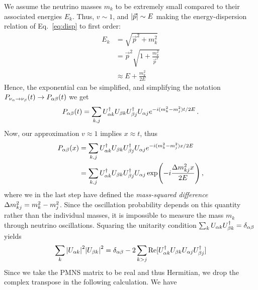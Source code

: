 We assume the neutrino masses $m_k$ to be extremely small compared to their associated energies $E_k$. 
Thus, $v\sim 1$, and $\abs{\vec{p}} \sim E$ making the energy-dispersion relation of Eq.~\ref{eq:disp} to first order:
\begin{align}\label{eq:ultra_rel}
    E_k &= \sqrt{\vec{p}^2 + m_k^2} \nonumber \\
        &= \vec{p}^2\sqrt{1 + \frac{m_k^2}{\vec{p}^2}} \nonumber \\
        &\approx E + \frac{m_k^2}{2E}
\end{align}
Hence, the exponential can be simplified, and simplifying the notation $P_{\nu_\alpha \to \nu_\beta}(t) \to P_{\alpha\beta}(t)$ we get 
\begin{align}
    P_{\alpha\beta}(t) = \sum_{k,j} U^\dagger_{\alpha k}U_{\beta k}U^\dagger_{\beta j}U_{\alpha j} e^{-i(m_k^2-m_j^2)t/2E}\,.
\end{align}
Now, our approximation $v\approx 1$ implies $x\approx t $, thus
\begin{align}
    P_{\ab}(x) &= \sum_{k,j} U^\dagger_{\a k}U_{\b k}U^\dagger_{\b j}U_{\a j} e^{-i(m_k^2-m_j^2)x/2E} \nonumber \\
                       &= \sum_{k,j} U^\dagger_{\a k}U_{\b k}U^\dagger_{\b j}U_{\a j} \exp(-i\frac{\dm_{kj}x}{2E})\,,
\end{align}
where we in the last step have defined the \emph{mass-squared difference} $\dm_{kj} = m_k^2 - m_j^2$. Since the oscillation probability depends on this quantity
rather than the individual masses, it is impossible to measure the mass $m_k$ through neutrino oscillations.
Squaring the unitarity condition $\sum_k U_{\alpha k}U_{\beta k}^\dagger = \delta_{\alpha \beta}$ yields 
\begin{align}
    \sum_k \abs{U_{\alpha k}}^2\abs{U_{\beta k}}^2 = \delta_{\alpha \beta} - 2 \sum_{k>j}\Re[U_{\alpha k}^\dagger U_{\beta k} U_{\alpha j} U_{\beta j}^\dagger]
\end{align}
Since we take the PMNS matrix to be real and thus Hermitian, we drop the complex transpose in the following calculation. We have
